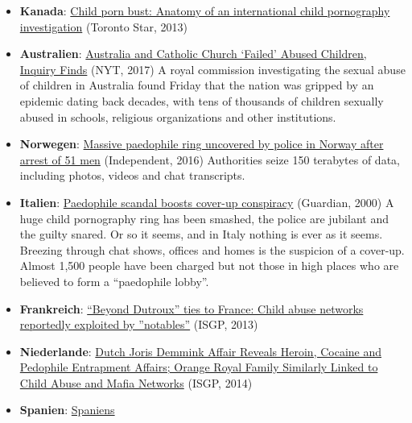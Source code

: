 \begin{itemize}
\tightlist
\item
  \textbf{Kanada}:
  \href{https://www.thestar.com/news/world/2013/11/14/child_porn_bust_anatomy_of_an_international_child_pornography_investigation.html}{Child
  porn bust: Anatomy of an international child pornography
  investigation} (Toronto Star, 2013)
\item
  \textbf{Australien}:
  \href{https://www.nytimes.com/2017/12/14/world/australia/australia-sexual-abuse-children.html}{Australia
  and Catholic Church `Failed' Abused Children, Inquiry Finds} (NYT,
  2017) A royal commission investigating the sexual abuse of children in
  Australia found Friday that the nation was gripped by an epidemic
  dating back decades, with tens of thousands of children sexually
  abused in schools, religious organizations and other institutions.
\item
  \textbf{Norwegen}:
  \href{https://www.independent.co.uk/news/world/europe/norway-paedophile-ring-police-arrest-51-men-a7432441.html}{Massive
  paedophile ring uncovered by police in Norway after arrest of 51 men}
  (Independent, 2016) Authorities seize 150 terabytes of data, including
  photos, videos and chat transcripts.
\item
  \textbf{Italien}:
  \href{https://www.theguardian.com/world/2000/nov/01/worlddispatch.rorycarroll}{Paedophile
  scandal boosts cover-up conspiracy} (Guardian, 2000) A huge child
  pornography ring has been smashed, the police are jubilant and the
  guilty snared. Or so it seems, and in Italy nothing is ever as it
  seems. Breezing through chat shows, offices and homes is the suspicion
  of a cover-up. Almost 1,500 people have been charged but not those in
  high places who are believed to form a ``paedophile lobby''.
\item
  \textbf{Frankreich}:
  \href{https://isgp-studies.com/elite-child-abuse-accusations-in-france}{``Beyond
  Dutroux'' ties to France: Child abuse networks reportedly exploited by
  ''notables''} (ISGP, 2013)
\item
  \textbf{Niederlande}:
  \href{https://isgp-studies.com/joris-demmink-and-prince-bernhard-s-alleged-westerflier-cult}{Dutch
  Joris Demmink Affair Reveals Heroin, Cocaine and Pedophile Entrapment
  Affairs; Orange Royal Family Similarly Linked to Child Abuse and Mafia
  Networks} (ISGP, 2014)
\item
  \textbf{Spanien}:
  \href{https://www.tagesspiegel.de/politik/francos-langer-schatten-spaniens-geraubte-kinder/7882508-all.html}{Spaniens
}
\end{itemize}
